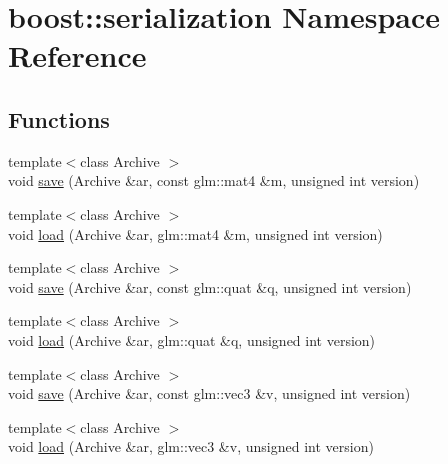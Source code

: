 \hypertarget{namespaceboost_1_1serialization}{\section{boost\-:\-:serialization Namespace Reference}
\label{namespaceboost_1_1serialization}
}
\subsection*{Functions}
\begin{DoxyCompactItemize}
\item 
{\footnotesize template$<$class Archive $>$ }\\void \hyperlink{namespaceboost_1_1serialization_a4661ba4b8e696d24c108466876cdc814}{save} (Archive \&ar, const glm\-::mat4 \&m, unsigned int version)
\item 
{\footnotesize template$<$class Archive $>$ }\\void \hyperlink{namespaceboost_1_1serialization_a2a9d8316c6eae9c07857cc3b90318826}{load} (Archive \&ar, glm\-::mat4 \&m, unsigned int version)
\item 
{\footnotesize template$<$class Archive $>$ }\\void \hyperlink{namespaceboost_1_1serialization_ab9e2332d359b78f6c63f3422aa72f07a}{save} (Archive \&ar, const glm\-::quat \&q, unsigned int version)
\item 
{\footnotesize template$<$class Archive $>$ }\\void \hyperlink{namespaceboost_1_1serialization_a3eff60bfb5849b9d53e8f00f319b31ec}{load} (Archive \&ar, glm\-::quat \&q, unsigned int version)
\item 
{\footnotesize template$<$class Archive $>$ }\\void \hyperlink{namespaceboost_1_1serialization_a7f16c014591fe7498eb510d7c8e4cd90}{save} (Archive \&ar, const glm\-::vec3 \&v, unsigned int version)
\item 
{\footnotesize template$<$class Archive $>$ }\\void \hyperlink{namespaceboost_1_1serialization_a02119b7bb2ec85df5d9b387b1d6e3afe}{load} (Archive \&ar, glm\-::vec3 \&v, unsigned int version)
\end{DoxyCompactItemize}


